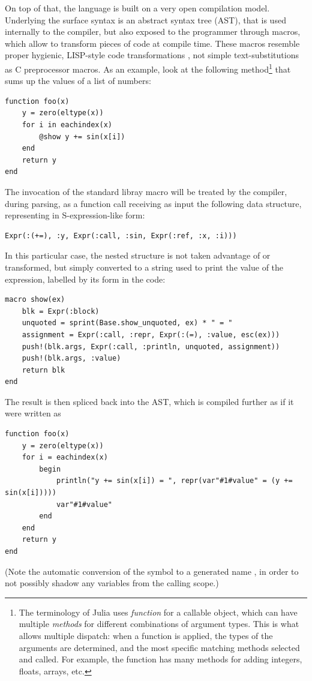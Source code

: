 On top of that, the language is built on a very open compilation model.  Underlying the surface
syntax is an abstract syntax tree (AST), that is used internally to the compiler, but also exposed
to the programmer through macros, which allow to transform pieces of code at compile time.  These
macros resemble proper hygienic, LISP-style code transformations \parencite[cf.][]{hoyte2008let},
not simple text-substitutions as C preprocessor macros.  As an example, look at the following
method\footnote{The terminology of Julia uses \emph{function} for a callable object, which can have
  multiple \emph{methods} for different combinations of argument types.  This is what allows
  multiple dispatch: when a function is applied, the types of the arguments are determined, and the
  most specific matching methods selected and called.  For example, the \protect\jlinl{+} function
  has many methods for adding integers, floats, arrays, etc.}  that sums up the  values of a
list of numbers:
\begin{lstlisting}
function foo(x)
    y = zero(eltype(x))
    for i in eachindex(x)
        @show y += sin(x[i])
    end
    return y
end
\end{lstlisting}
The invocation of the standard libray macro  will be treated by the compiler, during
parsing, as a function call receiving as input the following data structure, representing  in S-expression-like form:
\begin{lstlisting}
Expr(:(+=), :y, Expr(:call, :sin, Expr(:ref, :x, :i)))
\end{lstlisting}
In this particular case, the nested structure is not taken advantage of or transformed, but simply
converted to a string used to print the value of the expression, labelled by its form in the code:
\begin{lstlisting}
macro show(ex)
    blk = Expr(:block)
    unquoted = sprint(Base.show_unquoted, ex) * " = "
    assignment = Expr(:call, :repr, Expr(:(=), :value, esc(ex)))
    push!(blk.args, Expr(:call, :println, unquoted, assignment))
    push!(blk.args, :value)
    return blk
end
\end{lstlisting}
The result is then spliced back into the AST, which is compiled further as if it were written as
\begin{lstlisting}
function foo(x)
    y = zero(eltype(x))
    for i = eachindex(x)
        begin
            println("y += sin(x[i]) = ", repr(var"#1#value" = (y += sin(x[i]))))
            var"#1#value"
        end
    end
    return y
end
\end{lstlisting}
(Note the automatic conversion of the symbol  to a generated name , in
order to not possibly shadow any variables from the calling scope.)


